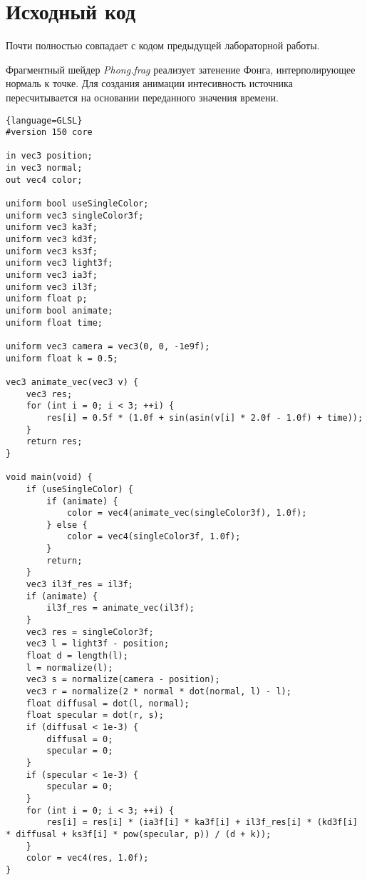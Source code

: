 \section{Исходный код}

Почти полностью совпадает с кодом предыдущей лабораторной работы.

Фрагментный шейдер \textit{Phong.frag} реализует затенение Фонга, интерполирующее нормаль к точке. Для создания анимации интесивность источника пересчитывается на основании переданного значения времени.

\begin{lstlisting}{language=GLSL}
#version 150 core

in vec3 position;
in vec3 normal;
out vec4 color;

uniform bool useSingleColor;
uniform vec3 singleColor3f;
uniform vec3 ka3f;
uniform vec3 kd3f;
uniform vec3 ks3f;
uniform vec3 light3f;
uniform vec3 ia3f;
uniform vec3 il3f;
uniform float p;
uniform bool animate;
uniform float time;

uniform vec3 camera = vec3(0, 0, -1e9f);
uniform float k = 0.5;

vec3 animate_vec(vec3 v) {
    vec3 res;
    for (int i = 0; i < 3; ++i) {
        res[i] = 0.5f * (1.0f + sin(asin(v[i] * 2.0f - 1.0f) + time));
    }
    return res;
}

void main(void) {
    if (useSingleColor) {
        if (animate) {
            color = vec4(animate_vec(singleColor3f), 1.0f);
        } else {
            color = vec4(singleColor3f, 1.0f);
        }
        return;
    }
    vec3 il3f_res = il3f;
    if (animate) {
        il3f_res = animate_vec(il3f);
    }
    vec3 res = singleColor3f;
    vec3 l = light3f - position;
    float d = length(l);
    l = normalize(l);
    vec3 s = normalize(camera - position);
    vec3 r = normalize(2 * normal * dot(normal, l) - l);
    float diffusal = dot(l, normal);
    float specular = dot(r, s);
    if (diffusal < 1e-3) {
        diffusal = 0;
        specular = 0;
    }
    if (specular < 1e-3) {
        specular = 0;
    }
    for (int i = 0; i < 3; ++i) {
        res[i] = res[i] * (ia3f[i] * ka3f[i] + il3f_res[i] * (kd3f[i] * diffusal + ks3f[i] * pow(specular, p)) / (d + k));
    }
    color = vec4(res, 1.0f);
}
\end{lstlisting}
\pagebreak
